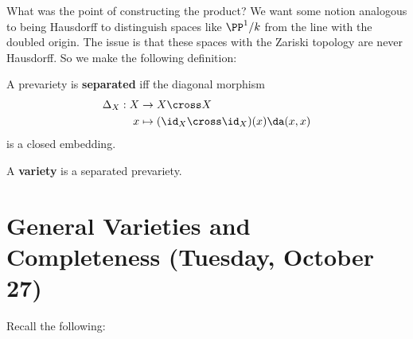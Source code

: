 What was the point of constructing the product? We want some notion
analogous to being Hausdorff to distinguish spaces like \(\PP^1/k\) from
the line with the doubled origin. The issue is that these spaces with
the Zariski topology are never Hausdorff. So we make the following
definition:

\begin{definition}[Separated]

A prevariety is \textbf{separated} iff the diagonal morphism
\begin{align*}  
\Delta_X: X &\to X\cross X \\
x &\mapsto (\id_X \cross \id_X)(x) \da (x, x)
\end{align*} is a closed embedding.

\end{definition}

\begin{definition}[Variety]

A \textbf{variety} is a separated prevariety.

\end{definition}

\hypertarget{general-varieties-and-completeness-tuesday-october-27}{%
\section{General Varieties and Completeness (Tuesday, October
27)}\label{general-varieties-and-completeness-tuesday-october-27}}

Recall the following:

